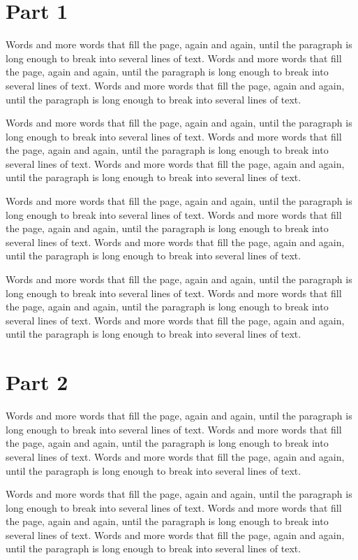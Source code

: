 \documentclass{article}
\begin{document}
\section{Part 1}
Words and more words that fill the page, again and again, until the paragraph is long enough to break into several lines of text. Words and more words that fill the page, again and again, until the paragraph is long enough to break into several lines of text. Words and more words that fill the page, again and again, until the paragraph is long enough to break into several lines of text. 

Words and more words that fill the page, again and again, until the paragraph is long enough to break into several lines of text. Words and more words that fill the page, again and again, until the paragraph is long enough to break into several lines of text. Words and more words that fill the page, again and again, until the paragraph is long enough to break into several lines of text. 

Words and more words that fill the page, again and again, until the paragraph is long enough to break into several lines of text. Words and more words that fill the page, again and again, until the paragraph is long enough to break into several lines of text. Words and more words that fill the page, again and again, until the paragraph is long enough to break into several lines of text. 

Words and more words that fill the page, again and again, until the paragraph is long enough to break into several lines of text. Words and more words that fill the page, again and again, until the paragraph is long enough to break into several lines of text. Words and more words that fill the page, again and again, until the paragraph is long enough to break into several lines of text. 

\section{Part 2}
Words and more words that fill the page, again and again, until the paragraph is long enough to break into several lines of text. Words and more words that fill the page, again and again, until the paragraph is long enough to break into several lines of text. Words and more words that fill the page, again and again, until the paragraph is long enough to break into several lines of text. 

Words and more words that fill the page, again and again, until the paragraph is long enough to break into several lines of text. Words and more words that fill the page, again and again, until the paragraph is long enough to break into several lines of text. Words and more words that fill the page, again and again, until the paragraph is long enough to break into several lines of text. 
\end{document}
